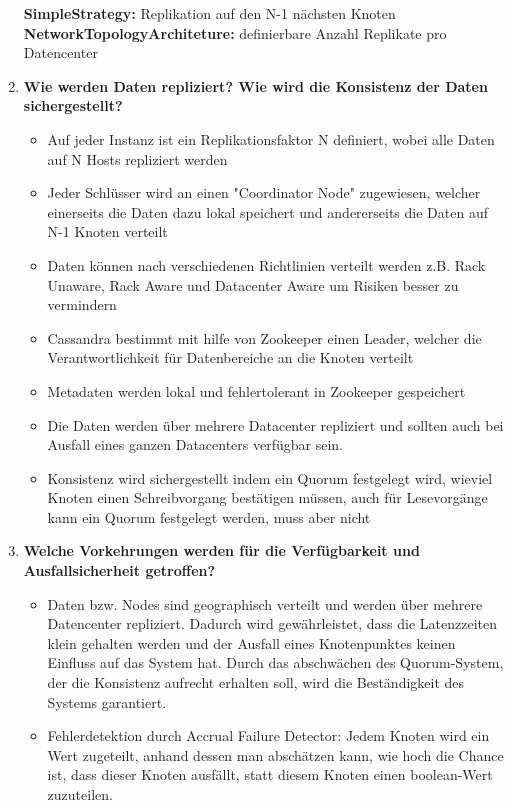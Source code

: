 \documentclass[a4paper,10pt,titlepage=false]{scrreprt}
\begin{document}
\begin{enumerate}
\textbf{SimpleStrategy:} Replikation auf den N-1 nächsten Knoten\\
\textbf{NetworkTopologyArchiteture:} definierbare Anzahl Replikate pro Datencenter\\
\item \textbf{ Wie werden Daten repliziert? Wie wird die Konsistenz der Daten sichergestellt?}\\
\begin{itemize}
  \item Auf jeder Instanz ist ein Replikationsfaktor N definiert, wobei alle Daten auf N Hosts repliziert werden
\item Jeder Schlüsser wird an einen "Coordinator Node" zugewiesen, welcher einerseits die Daten dazu lokal speichert und andererseits die Daten auf N-1 Knoten verteilt
\item Daten können nach verschiedenen Richtlinien verteilt werden z.B. Rack Unaware, Rack Aware und Datacenter Aware um Risiken besser zu vermindern
\item Cassandra bestimmt mit hilfe von Zookeeper einen Leader, welcher die Verantwortlichkeit für Datenbereiche an die Knoten verteilt
\item Metadaten werden lokal und fehlertolerant in Zookeeper gespeichert
\item Die Daten werden über mehrere Datacenter repliziert und sollten auch bei Ausfall eines ganzen Datacenters verfügbar sein.
\item Konsistenz wird sichergestellt indem ein Quorum festgelegt wird, wieviel Knoten einen Schreibvorgang bestätigen müssen, auch für Lesevorgänge kann ein Quorum festgelegt werden, muss aber nicht
\end{itemize}
\item \textbf{Welche Vorkehrungen werden für die Verfügbarkeit und Ausfallsicherheit getroffen?} \\
\begin{itemize}
  \item Daten bzw. Nodes sind geographisch verteilt und werden über mehrere Datencenter repliziert. Dadurch wird gewährleistet, dass die Latenzzeiten klein gehalten werden und der Ausfall eines Knotenpunktes keinen Einfluss auf das System hat. Durch das abschwächen des Quorum-System, der die Konsistenz aufrecht erhalten soll, wird die Beständigkeit des Systems garantiert.
\item Fehlerdetektion durch Accrual Failure Detector: Jedem Knoten wird ein Wert zugeteilt, anhand dessen man abschätzen kann, wie hoch die Chance ist, dass dieser Knoten ausfällt, statt diesem Knoten einen boolean-Wert zuzuteilen.

\end{itemize}
\end{enumerate}
\end{document}
